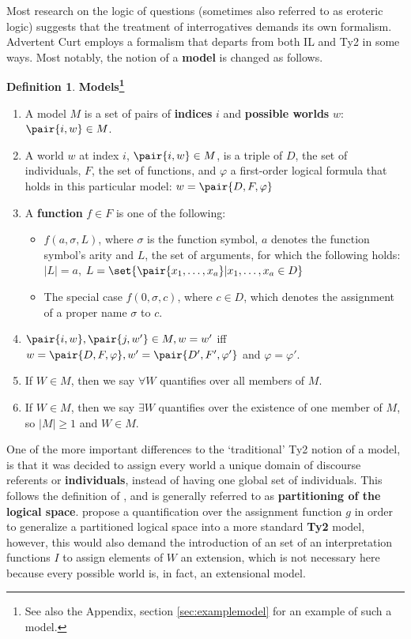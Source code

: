 \documentclass[notitlepage,twoside,a4paper]{scrreprt}
\newcommand{\abbr}{\textsf} %
\newcommand{\stress}{\textbf} %
\newcommand{\term}[1]{\textsf{\textbf{#1}}} %
\newcommand{\pn}{\textsf} %
\newcommand{\acurt}{\pn{Advertent Curt}}
\theoremstyle{remark}
\theoremstyle{remark}
\theoremstyle{definition}
\newtheorem{definition}[thm]{Definition}
\theoremstyle{definition}
\begin{document}
Most research on the logic of questions (sometimes also referred to as eroteric
logic) suggests that the treatment of interrogatives demands its own formalism.
\acurt{} employs a formalism that departs from both \abbr{IL} and \abbr{Ty2} in
some ways. Most notably, the notion of a \term{model} is changed as follows.

\begin{definition}\label{Models}
  \stress{Models\footnote{See also the Appendix, section \ref{sec:examplemodel}
  for an example of such a model.}}
  \begin{enumerate}
    \item A model $M$ is a set of pairs of \term{indices} $i$ and \term{possible
    worlds} $w$: $\pair{i,w} \in M$. 
    \item A world $w$ at index $i$, $\pair{i,w} \in M$, is a triple of $D$, the set
    of individuals, $F$, the set of functions, and $\varphi$ a first-order
    logical formula that holds in this particular model: $w = \pair{D,F,\varphi}$
    \item A \term{function} $f \in F$ is one of the following: 
    \begin{itemize}
      \item $f(a,\sigma,L)$, where $\sigma$ is the function symbol, $a$ denotes
      the function symbol's arity and $L$, the set of arguments, for which the
      following holds: $|L| = a$,
      $L = \set{\pair{x_1,\ldots{},x_a}|x_1,\ldots{},x_a \in D}$
      \item The special case $f(0,\sigma,c)$, where $c \in D$, which denotes the
      assignment of a proper name $\sigma$ to $c$.
    \end{itemize}
    \item $\pair{i,w}, \pair{j,w'} \in M, w = w'$ iff $w = \pair{D,F,\varphi}, w' =
    \pair{D',F',\varphi'}$ and $\varphi = \varphi'$.
    \item If $W \in M$, then we say $\forall W$ quantifies over all members of $M$.
    \item If $W \in M$, then we say $\exists W$ quantifies over the existence of
    one member of $M$, so $|M| \geq 1$ and $W \in M$.
  \end{enumerate}
\end{definition}

One of the more important differences to the `traditional' \abbr{Ty2} notion
of a model, is that it was decided to assign every world a unique domain of
discourse referents or \term{individuals}, instead of having one global set of
individuals. This follows the definition of
\cite{gs:q}, and is generally referred to as \term{partitioning of the logical
space}. \cite{tenCate} propose a
quantification over the assignment function $g$ in order to generalize a
partitioned logical space into a more standard \term{Ty2} model, however, this
would also demand the introduction of an set of an interpretation functions $I$
to assign elements of $W$ an extension, which is not necessary here because
every possible world is, in fact, an extensional model.
\end{document}
